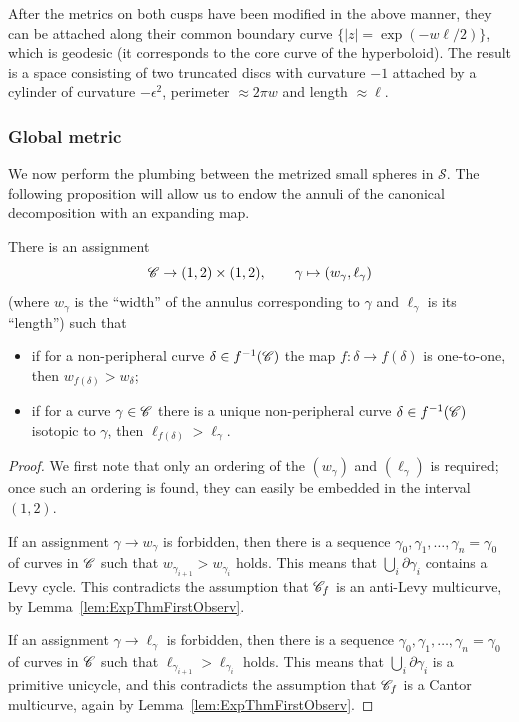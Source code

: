 \documentclass{amsart}
\newcommand\Sph{{\mathscr S}}
\begin{document}
After the metrics on both cusps have been modified in the above
manner, they can be attached along their common boundary curve
$\{|z|=\exp(-w\ell/2)\}$, which is geodesic (it corresponds to the
core curve of the hyperboloid). The result is a space consisting of
two truncated discs with curvature $-1$ attached by a cylinder of
curvature $-\epsilon^2$, perimeter $\approx2\pi w$ and length
$\approx\ell$.

\subsubsection{Global metric}\label{sss:GlobMetr}
We now perform the plumbing between the metrized small spheres in
$\Sph$. The following proposition will allow us to endow the annuli of
the canonical decomposition with an expanding map.
\begin{prop}\label{prop:CombGl}
  There is an assignment
  \[{\mathscr C}\to(1,2)\times(1,2),\qquad \gamma\mapsto(w_\gamma,\ell_\gamma)
  \]
  (where $w_\gamma$ is the ``width'' of the annulus corresponding to
  $\gamma$ and $\ell_\gamma$ is its ``length'') such that
  \begin{itemize}
  \item if for a non-peripheral curve $\delta\in f^{-1}({\mathscr C})$ the map
    $f\colon \delta\to f(\delta)$ is one-to-one, then
    $w_{f(\delta)}>w_\delta$;
  \item if for a curve $\gamma\in{\mathscr C}$ there is a unique non-peripheral
    curve $\delta\in f^{-1}({\mathscr C})$ isotopic to $\gamma$, then
    $\ell_{f(\delta)}>\ell_\gamma$.
  \end{itemize}
\end{prop}
\begin{proof}
  We first note that only an ordering of the $(w_\gamma)$ and
  $(\ell_\gamma)$ is required; once such an ordering is found, they
  can easily be embedded in the interval $(1,2)$.

  If an assignment $\gamma\to w_\gamma$ is forbidden, then there is a
  sequence $\gamma_0,\gamma_1,\dots,\gamma_n=\gamma_0$ of curves in
  ${\mathscr C}$ such that $w_{\gamma_{i+1}}>w_{\gamma_i}$ holds. This means
  that $\bigcup_i\partial \gamma_i$ contains a Levy cycle. This
  contradicts the assumption that ${\mathscr C}_f$ is an anti-Levy multicurve,
  by Lemma~\ref{lem:ExpThmFirstObserv}.

  If an assignment $\gamma\to\ell_\gamma$ is forbidden, then there is
  a sequence $\gamma_0,\gamma_1,\dots,\gamma_n=\gamma_0$ of curves in
  ${\mathscr C}$ such that $\ell_{\gamma_{i+1}}>\ell_{\gamma_i}$ holds. This
  means that $\bigcup_i\partial \gamma_i$ is a primitive unicycle, and
  this contradicts the assumption that ${\mathscr C}_f$ is a Cantor multicurve,
  again by Lemma~\ref{lem:ExpThmFirstObserv}.
\end{proof}
\end{document}
